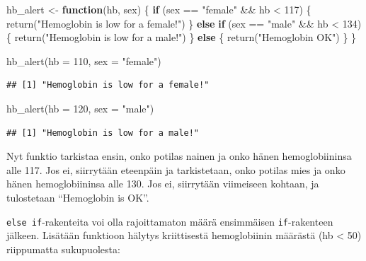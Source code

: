 \documentclass[
]{book}
\newenvironment{Shaded}{\begin{snugshade}}{\end{snugshade}}
\newcommand{\AttributeTok}[1]{\textcolor[rgb]{0.77,0.63,0.00}{#1}}
\newcommand{\ControlFlowTok}[1]{\textcolor[rgb]{0.13,0.29,0.53}{\textbf{#1}}}
\newcommand{\DecValTok}[1]{\textcolor[rgb]{0.00,0.00,0.81}{#1}}
\newcommand{\FunctionTok}[1]{\textcolor[rgb]{0.00,0.00,0.00}{#1}}
\newcommand{\NormalTok}[1]{#1}
\newcommand{\OtherTok}[1]{\textcolor[rgb]{0.56,0.35,0.01}{#1}}
\newcommand{\SpecialCharTok}[1]{\textcolor[rgb]{0.00,0.00,0.00}{#1}}
\newcommand{\StringTok}[1]{\textcolor[rgb]{0.31,0.60,0.02}{#1}}
\begin{document}
\begin{Shaded}
\begin{Highlighting}[]
\NormalTok{hb\_alert }\OtherTok{\textless{}{-}} \ControlFlowTok{function}\NormalTok{(hb, sex) \{}
  \ControlFlowTok{if}\NormalTok{ (sex }\SpecialCharTok{==} \StringTok{"female"} \SpecialCharTok{\&\&}\NormalTok{ hb }\SpecialCharTok{\textless{}} \DecValTok{117}\NormalTok{) \{}
    \FunctionTok{return}\NormalTok{(}\StringTok{"Hemoglobin is low for a female!"}\NormalTok{)}
\NormalTok{  \} }\ControlFlowTok{else} \ControlFlowTok{if}\NormalTok{ (sex }\SpecialCharTok{==} \StringTok{"male"} \SpecialCharTok{\&\&}\NormalTok{ hb }\SpecialCharTok{\textless{}} \DecValTok{134}\NormalTok{) \{}
    \FunctionTok{return}\NormalTok{(}\StringTok{"Hemoglobin is low for a male!"}\NormalTok{)}
\NormalTok{  \} }\ControlFlowTok{else}\NormalTok{ \{}
    \FunctionTok{return}\NormalTok{(}\StringTok{"Hemoglobin OK"}\NormalTok{)}
\NormalTok{  \}}
\NormalTok{\}}

\FunctionTok{hb\_alert}\NormalTok{(}\AttributeTok{hb =} \DecValTok{110}\NormalTok{, }\AttributeTok{sex =} \StringTok{"female"}\NormalTok{)}
\end{Highlighting}
\end{Shaded}

\begin{verbatim}
## [1] "Hemoglobin is low for a female!"
\end{verbatim}

\begin{Shaded}
\begin{Highlighting}[]
\FunctionTok{hb\_alert}\NormalTok{(}\AttributeTok{hb =} \DecValTok{120}\NormalTok{, }\AttributeTok{sex =} \StringTok{"male"}\NormalTok{)}
\end{Highlighting}
\end{Shaded}

\begin{verbatim}
## [1] "Hemoglobin is low for a male!"
\end{verbatim}

Nyt funktio tarkistaa ensin, onko potilas nainen ja onko hänen hemoglobiininsa alle 117. Jos ei, siirrytään eteenpäin ja tarkistetaan, onko potilas mies ja onko hänen hemoglobiininsa alle 130. Jos ei, siirrytään viimeiseen kohtaan, ja tulostetaan ``Hemoglobin is OK''.

\texttt{else\ if}-rakenteita voi olla rajoittamaton määrä ensimmäisen \texttt{if}-rakenteen jälkeen. Lisätään funktioon hälytys kriittisestä hemoglobiinin määrästä (hb \textless{} 50) riippumatta sukupuolesta:
\end{document}
